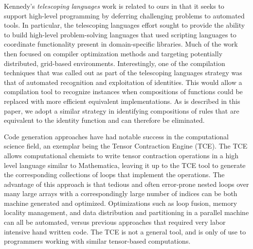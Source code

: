 Kennedy's \emph{telescoping languages} work is related to ours in that it seeks
to support high-level programming by deferring challenging problems to automated
tools. In particular, the telescoping languages effort sought to provide the
ability to build high-level problem-solving languages that used scripting
languages to coordinate functionality present in domain-specific
libraries\cite{kennedy00telescoping}. Much of the work then focused on compiler
optimization methods and targeting potentially distributed, grid-based
environments. Interestingly, one of the compilation techniques that was called
out as part of the telescoping languages strategy was that of automated
recognition and exploitation of identities. This would allow a compilation tool
to recognize instances when compositions of functions could be replaced with
more efficient equivalent implementations. As is described in this paper, we
adopt a similar strategy in identifying compositions of rules that are
equivalent to the identity function and can therefore be eliminated.

Code generation approaches have had notable success in the computational science
field, an exemplar being the Tensor Contraction Engine
(TCE)\cite{baumgartner05synthesis}. The TCE allows computational chemists to
write tensor contraction operations in a high level language similar to
Mathematica, leaving it up to the TCE tool to generate the corresponding
collections of loops that implement the operations. The advantage of this
approach is that tedious and often error-prone nested loops over many large
arrays with a correspondingly large number of indices can be both machine
generated and optimized. Optimizations such as loop fusion, memory locality
management, and data distribution and partitioning in a parallel machine can all
be automated, versus previous approaches that required very labor intensive hand
written code. The TCE is not a general tool, and is only of use to programmers
working with similar tensor-based computations.
